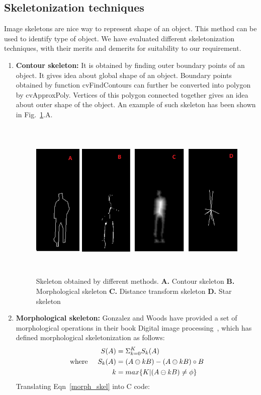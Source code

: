 \subsection{Skeletonization techniques}
\indent Image skeletons are nice way to represent shape of an object.
This method can be used to identify type of object. We have evaluated
different skeletonization techniques, with their merits and demerits for
suitability to our requirement.
\begin{enumerate}
\item \textbf{Contour skeleton:} It is obtained by finding outer
	boundary points of an object. It gives idea about global shape
	of an object. Boundary points obtained by function
	cvFindContours can further be converted into polygon by
	cvApproxPoly. Vertices of this polygon connected together gives
	an idea about outer shape of the object. An example of such
	skeleton has been shown in Fig.~\ref{skeletons}.A.

\begin{figure}[!t]
\centering
\includegraphics[height=220pt]{Figures/skeletons}
\caption{Skeleton obtained by different methods. \textbf{A.} Contour
skeleton \textbf{B.} Morphological skeleton \textbf{C.} Distance
transform skeleton \textbf{D.} Star skeleton}
\label{skeletons}
\end{figure}
\item \textbf{Morphological skeleton:} Gonzalez and Woods have provided
	a set of morphological operations in their book Digital image
	processing~\cite{35}, which has defined morphological
	skeletonization as follows:
	\begin{equation}
	\begin{aligned}
		S(A) &= \Sigma ^K _{k = 0} S_k(A) \label{morph_skel}\\
	\mathrm{where} \hspace{5 mm} S_k(A) &= (A \ominus kB) - (A \ominus kB) \circ B \\
			  k &= max \{ K | (A \ominus kB) \neq \phi\}
	\end{aligned}
	\end{equation}
Translating Eqn~\ref{morph_skel} into C code:
\begin{lstlisting}


\end{lstlisting}
\end{enumerate}
